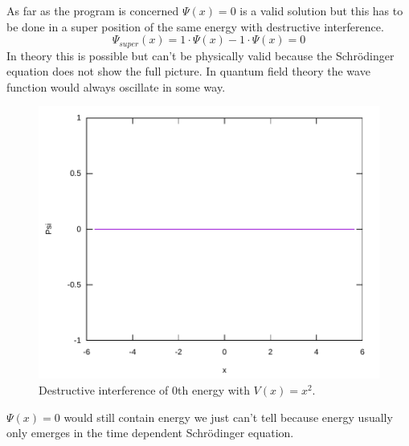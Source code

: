 \documentclass[11pt,DIV=10,final]{scrreprt} %
\begin{document}
\begin{minipage}{\textwidth}
As far as the program is concerned $\Psi(x) = 0$ is a valid solution but this has to be done
in a super position of the same energy with destructive interference.
\[
  \Psi_{super}(x) = 1 \cdot \Psi(x) - 1 \cdot \Psi(x) = 0
\]
In theory this is possible but can't be physically valid because the Schrödinger equation
does not show the full picture. In quantum field theory the wave function would always
oscillate in some way.
\begin{figure}[H]
  \centering
  \includegraphics[width=\textwidth]{plots/super-square-0-0-destructive.pdf}
  \caption{Destructive interference of 0th energy with $V(x) = x^{2}$.}
\end{figure}

$\Psi(x) = 0$ would still contain energy we just can't tell because energy usually only
emerges in the time dependent Schrödinger equation.
\end{minipage}
\end{document}
